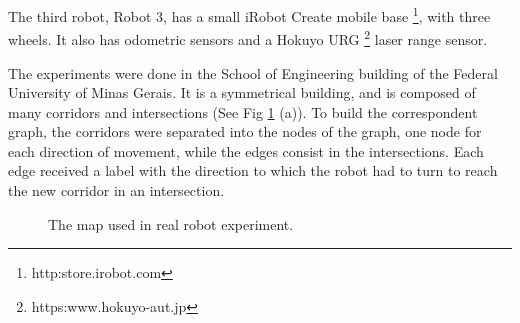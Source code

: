 \documentclass[twocolumn]{svjour3}       %
\begin{document}
The third robot, Robot 3, has a small iRobot Create mobile base \footnote{http:\/\/store.irobot.com}, with three wheels. It also has odometric sensors and a Hokuyo URG \footnote{https:\/\/www.hokuyo-aut.jp} laser range sensor. 

The experiments were done in the School of Engineering building of the Federal University of Minas Gerais. It is a symmetrical building, and is composed of many corridors and intersections (See Fig \ref{fig:depmap} (a)). To build the correspondent graph, the corridors were separated into the nodes of the graph, one node for each direction of movement, while the edges consist in the intersections. Each edge received a label with the direction to which the robot had to turn to reach the new corridor in an intersection. 

\begin{figure}
\centering
{}
\caption{The map used in real robot experiment.}
\label{fig:depmap}
\end{figure}
\end{document}

